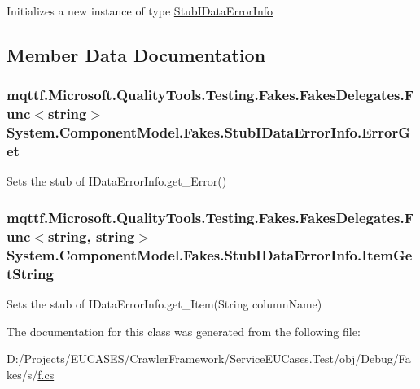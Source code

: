 Initializes a new instance of type \hyperlink{class_system_1_1_component_model_1_1_fakes_1_1_stub_i_data_error_info}{Stub\-I\-Data\-Error\-Info}



\subsection{Member Data Documentation}
\hypertarget{class_system_1_1_component_model_1_1_fakes_1_1_stub_i_data_error_info_a4ead4c05c24359a27c14cfba0b56f99a}{
\subsubsection[{Error\-Get}]{\setlength{\rightskip}{0pt plus 5cm}mqttf.\-Microsoft.\-Quality\-Tools.\-Testing.\-Fakes.\-Fakes\-Delegates.\-Func$<$string$>$ System.\-Component\-Model.\-Fakes.\-Stub\-I\-Data\-Error\-Info.\-Error\-Get}}\label{class_system_1_1_component_model_1_1_fakes_1_1_stub_i_data_error_info_a4ead4c05c24359a27c14cfba0b56f99a}


Sets the stub of I\-Data\-Error\-Info.\-get\-\_\-\-Error()

\hypertarget{class_system_1_1_component_model_1_1_fakes_1_1_stub_i_data_error_info_a5e078ea57272f5c6247f5bf8c628077f}{
\subsubsection[{Item\-Get\-String}]{\setlength{\rightskip}{0pt plus 5cm}mqttf.\-Microsoft.\-Quality\-Tools.\-Testing.\-Fakes.\-Fakes\-Delegates.\-Func$<$string, string$>$ System.\-Component\-Model.\-Fakes.\-Stub\-I\-Data\-Error\-Info.\-Item\-Get\-String}}\label{class_system_1_1_component_model_1_1_fakes_1_1_stub_i_data_error_info_a5e078ea57272f5c6247f5bf8c628077f}


Sets the stub of I\-Data\-Error\-Info.\-get\-\_\-\-Item(\-String column\-Name)



The documentation for this class was generated from the following file\-:\begin{DoxyCompactItemize}
\item 
D\-:/\-Projects/\-E\-U\-C\-A\-S\-E\-S/\-Crawler\-Framework/\-Service\-E\-U\-Cases.\-Test/obj/\-Debug/\-Fakes/s/\hyperlink{s_2f_8cs}{f.\-cs}\end{DoxyCompactItemize}
